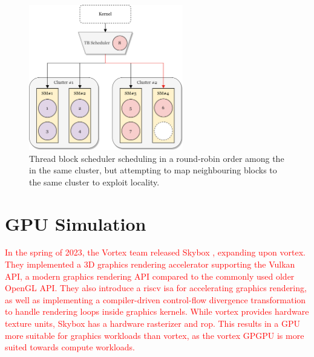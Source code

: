 \begin{figure}
    \centering
    \includegraphics[width=0.6\textwidth]{figures/TB_scheduler.png}
    \caption[\acrshort{tb} scheduling]{Thread block scheduler scheduling  in a round-robin order among the  in the same cluster, but attempting to map neighbouring blocks to the same cluster to exploit locality.}
    \label{fig:tb_scheduler}
\end{figure}



\section{GPU Simulation} \label{sec:gpu_simulation}

\textcolor{red}{
In the spring of 2023, the Vortex team released Skybox \cite{skybox}, expanding upon \Gls{vortex}. They implemented a 3D graphics rendering accelerator supporting the Vulkan API, a modern graphics rendering API compared to the commonly used older OpenGL API. They also introduce a \Gls{riscv} \acrshort{isa} for accelerating graphics rendering, as well as implementing a compiler-driven control-flow divergence transformation to handle rendering loops inside graphics kernels. While \Gls{vortex} provides hardware texture units, Skybox has a hardware rasterizer and \acrfull{rop}. This results in a GPU more suitable for graphics workloads than \Gls{vortex}, as the \Gls{vortex} GPGPU is more suited towards compute workloads.}

